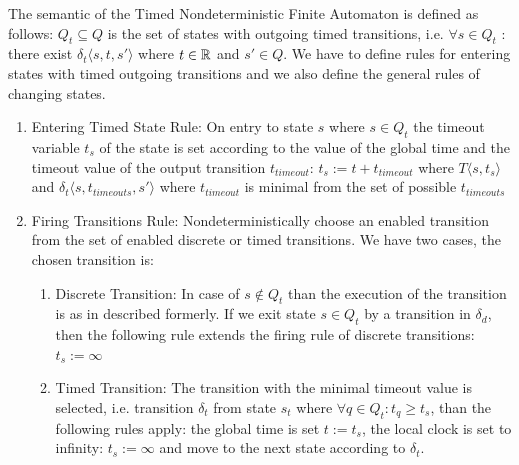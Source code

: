 			The semantic of the Timed Nondeterministic Finite Automaton is defined as follows:
			$Q_t \subseteq Q$ is the set of states with outgoing timed transitions, i.e. $\forall s \in Q_t$ : there exist $ \delta_t\langle s, t, s' \rangle$ where $t \in \mathbb{R}$ and $s' \in Q$.
			We have to define rules for entering states with timed outgoing transitions and we also define the general rules of changing states. 
			\begin{enumerate}
				\item Entering Timed State Rule: On entry to state $s$ where $s \in Q_t$ the timeout variable $t_s$ of the state is set according to the value of the global time and the timeout value of the output transition $t_{timeout}$:
					$t_s:= t+t_{timeout}$ \TODO
					where $T\langle s,t_s \rangle$ and $\delta_t\langle s,t_{timeouts},s' \rangle$ where $t_{timeout}$ is minimal from the set of possible $t_{timeouts}$ 
				
				\item Firing Transitions Rule: Nondeterministically choose an enabled transition from the set of enabled discrete or timed transitions. We have two cases, the chosen transition is:
					\begin{enumerate}
						\item Discrete Transition: In case of $s \notin Q_t$ than the execution of the transition is as in described formerly. If we exit state $s \in Q_t$ by a transition in $\delta_d$, 
						then the following rule extends the firing rule of discrete transitions:
							$t_s := \infty$
						\item Timed Transition: The transition with the minimal timeout value is selected, i.e. transition $\delta_t$ from state $s_t$ where $\forall q \in Q_t: t_q \geq t_s$, than the following rules apply:
						 the global time is set $t := t_s$, the local clock is set to infinity: $t_s := \infty$ and move to the next state according to $\delta_t$.
							
					\end{enumerate}
					
			
			\end{enumerate}
				


